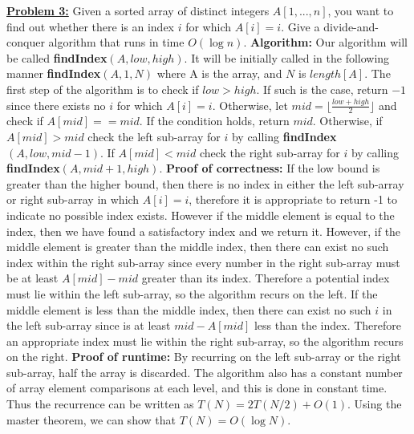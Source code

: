 \documentclass[11pt]{article}
\begin{document}
\begin{flushleft}
	\newpage
	\item \textbf {\underline{Problem 3:}} Given a sorted array of distinct integers $A[1, . . . , n]$, you want to
	find out whether there is an index $i$ for which $A[i] = i$. Give a
	divide-and-conquer algorithm that runs in time $O(\log n).$
	\newline
	\newline
	\textbf{Algorithm:} Our algorithm will be called \textbf{findIndex}$(A, low, high)$. It will be initially called in the following manner \textbf{findIndex}$(A, 1, N)$ where A is the array, and $N$ is $length[A]$. The first step of the algorithm is to check if $low > high$. If such is the case, return $-1$ since there exists no $i$ for which $A[i] = i$. Otherwise, let $mid = \lfloor \frac{low + high}{2} \rfloor$ and check if $A[mid] == mid$. If the condition holds, return $mid$. Otherwise, if $A[mid] > mid$ check the left sub-array for $i$ by calling \textbf{findIndex}$(A, low, mid - 1)$. If $A[mid] < mid$ check the right sub-array for $i$ by calling \textbf{findIndex}$(A, mid + 1, high)$. 
	\newline
	\newline
	\textbf{Proof of correctness:} If the low bound is greater than the higher bound, then there is no index in either the left sub-array or right sub-array in which $A[i] = i$, therefore it is appropriate to return -1 to indicate no possible index exists. However if the middle element is equal to the index, then we have found a satisfactory index and we return it. However, if the middle element is greater than the middle index, then there can exist no such index within the right sub-array since every number in the right sub-array must be at least $A[mid] - mid$ greater than its index. Therefore a potential index must lie within the left sub-array, so the algorithm recurs on the left. If the middle element is less than the middle index, then there can exist no such $i$ in the left sub-array since is at least $mid - A[mid]$ less than the index. Therefore an appropriate index must lie within the right sub-array, so the algorithm recurs on the right. 
	\newline
	\newline
	\textbf{Proof of runtime: }By recurring on the left sub-array or the right sub-array, half the array is discarded. The algorithm also has a constant number of array element comparisons at each level, and this is done in constant time. Thus the recurrence can be written as $T(N) = 2T(N / 2) + O(1)$. Using the master theorem, we can show that $T(N) = O(\log N)$.

\end{flushleft}
\end{document}
